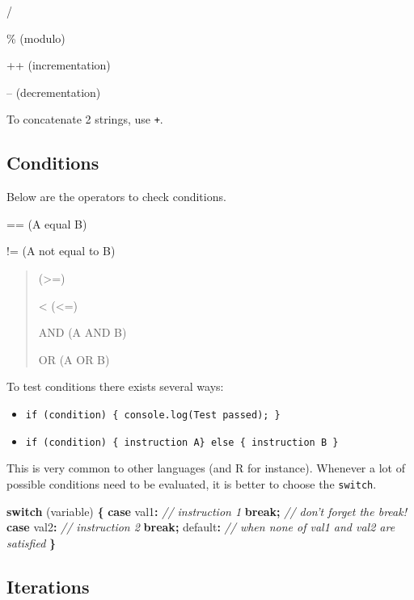 \documentclass[]{book}
\newenvironment{Shaded}{\begin{snugshade}}{\end{snugshade}}
\newcommand{\CommentTok}[1]{\textcolor[rgb]{0.56,0.35,0.01}{\textit{#1}}}
\newcommand{\ControlFlowTok}[1]{\textcolor[rgb]{0.13,0.29,0.53}{\textbf{#1}}}
\newcommand{\DataTypeTok}[1]{\textcolor[rgb]{0.13,0.29,0.53}{#1}}
\newcommand{\NormalTok}[1]{#1}
\newcommand{\OperatorTok}[1]{\textcolor[rgb]{0.81,0.36,0.00}{\textbf{#1}}}
\providecommand{\tightlist}{%
  \setlength{\itemsep}{0pt}\setlength{\parskip}{0pt}}
\begin{document}
/

\% (modulo)

++ (incrementation)

-- (decrementation)

To concatenate 2 strings, use \texttt{+}.

\hypertarget{conditions}{%
\subsection{Conditions}\label{conditions}}

Below are the operators to check conditions.

== (A equal B)

!= (A not equal to B)

\begin{quote}
(\textgreater{}=)

\textless{} (\textless{}=)

AND (A AND B)

OR (A OR B)
\end{quote}

To test conditions there exists several ways:

\begin{itemize}
\tightlist
\item
  \texttt{if\ (condition)\ \{\ console.log(\textquotesingle{}Test\ passed\textquotesingle{});\ \}}
\item
  \texttt{if\ (condition)\ \{\ instruction\ A\}\ else\ \{\ instruction\ B\ \}}
\end{itemize}

This is very common to other languages (and R for instance). Whenever a lot of possible conditions need to be evaluated, it is better to choose the \texttt{switch}.

\begin{Shaded}
\begin{Highlighting}[]
\ControlFlowTok{switch}\NormalTok{ (variable) }\OperatorTok{\{}
  \ControlFlowTok{case} \DataTypeTok{val1}\OperatorTok{:} \CommentTok{// instruction 1}
  \ControlFlowTok{break}\OperatorTok{;} \CommentTok{// don't forget the break!}
  \ControlFlowTok{case} \DataTypeTok{val2}\OperatorTok{:}  \CommentTok{// instruction 2}
  \ControlFlowTok{break}\OperatorTok{;}
  \DataTypeTok{default}\OperatorTok{:} \CommentTok{// when none of val1 and val2 are satisfied}
\OperatorTok{\}}
\end{Highlighting}
\end{Shaded}

\hypertarget{iterations}{%
\subsection{Iterations}\label{iterations}}
\end{document}
